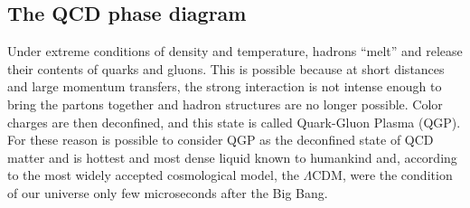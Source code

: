 \documentclass[12pt,a4paper]{book}
\begin{document}
	\subsection{The QCD phase diagram}
	Under extreme conditions of density and temperature, hadrons “melt” and release their contents of quarks and gluons. This is possible because at short distances and large momentum transfers, the strong interaction is not intense enough to bring the partons together and hadron structures are no longer possible. Color charges are then deconfined, and this state is called Quark-Gluon Plasma (QGP). For these reason is possible to consider QGP as the deconfined state of QCD matter and is hottest and most dense liquid known to humankind and, according to the most widely accepted cosmological model, the $\Lambda$CDM, were the condition of our universe only few microseconds after the Big Bang\cite{QCDPhase-Diagram}.
	
\end{document}
